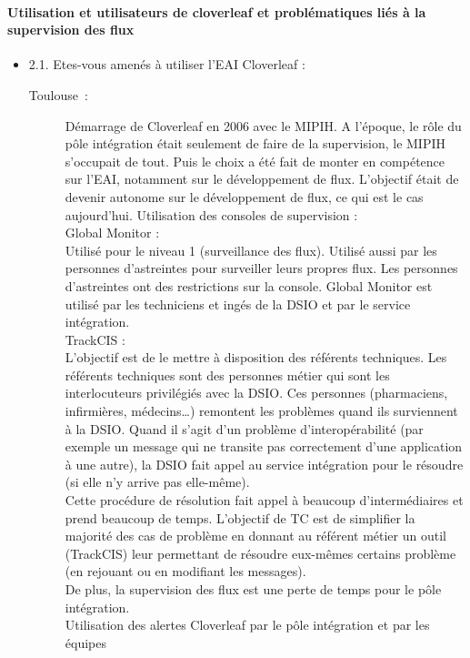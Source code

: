 	\paragraph{Utilisation et utilisateurs de cloverleaf et problématiques liés à la
	supervision des flux}
	\begin{itemize}
	  \item 2.1. Etes-vous amenés à utiliser l’EAI Cloverleaf :
  	  \begin{description}
	  	\item[Toulouse~:] Démarrage de Cloverleaf en 2006 avec le MIPIH. A l’époque,
	  	le rôle du pôle intégration était seulement de faire de la supervision, le
	  	MIPIH s’occupait de tout. Puis le choix a été fait de monter en compétence
	  	sur l’EAI, notamment sur le développement de flux. L’objectif était de
	  	devenir autonome sur le développement de flux, ce qui est le cas
	  	aujourd’hui. Utilisation des consoles de supervision :\\
	  	Global Monitor :\\
	  	Utilisé pour le niveau 1 (surveillance des flux). Utilisé aussi par les
	  	personnes d’astreintes pour surveiller leurs propres flux. Les personnes
	  	d’astreintes ont des restrictions sur la console.
		Global Monitor est utilisé par les techniciens et ingés de la DSIO et par le service
		intégration.\\
	  	TrackCIS :\\
	  	L’objectif est de le mettre à disposition des référents techniques.
		Les référents techniques sont des personnes métier qui sont les interlocuteurs
		privilégiés avec la DSIO. Ces personnes (pharmaciens, infirmières, médecins…)
		remontent les problèmes quand ils surviennent à la DSIO. Quand il s’agit d’un
		problème d’interopérabilité (par exemple un message qui ne transite pas
		correctement d’une application à une autre), la DSIO fait appel au service
		intégration pour le résoudre (si elle n’y arrive pas elle-même).\\
	  	Cette procédure de résolution fait appel à beaucoup d’intermédiaires et
	  	prend beaucoup de temps. L’objectif de TC est de simplifier la majorité des
	  	cas de problème en donnant au référent métier un outil (TrackCIS) leur permettant
	  	de résoudre eux-mêmes certains problème (en rejouant ou en modifiant les
	  	messages).\\
		De plus, la supervision des flux est une perte de temps pour le pôle
		intégration.\\
		Utilisation des alertes Cloverleaf par le pôle intégration et par les équipes

\end{description}
\end{itemize}
